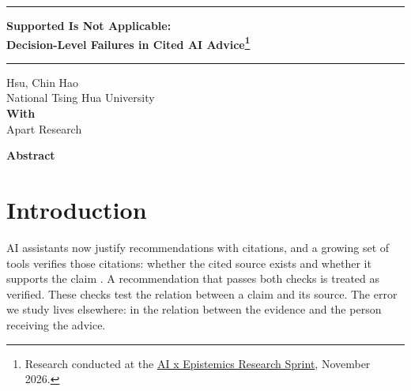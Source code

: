 \documentclass[11pt,letterpaper]{article}
\begin{document}
\vspace*{-0.35in}\noindent\rule{\textwidth}{2.4pt}\par\vspace{4pt}
\begin{center}
{\fontsize{19}{23}\selectfont\bfseries Supported Is Not Applicable:\\[2pt] Decision-Level Failures in Cited AI Advice\footnote{Research conducted at the \href{https://apartresearch.com/sprints/ai-x-epistemics-research-sprint-2026-11-13-to-2026-11-15}{AI x Epistemics Research Sprint}, November 2026.}}\par
\end{center}
\vspace{-2pt}\noindent\rule{\textwidth}{0.6pt}\par\vspace{2pt}
\begin{center}
Hsu, Chin Hao\\ National Tsing Hua University\\[4pt]
\textbf{With}\\ Apart Research
\end{center}
\vspace{-2pt}
\begin{center}{\large\bfseries Abstract}\end{center}
\vspace{-6pt}
\begin{list}{}{\leftmargin=0.3in\rightmargin=0.3in}\item\relax\small
\AbstractText
\end{list}
\vspace{0pt}
\begin{center}
\resizebox{\textwidth}{!}{}
\label{fig:concept}
\end{center}

\section{Introduction}
AI assistants now justify recommendations with citations, and a growing set of tools verifies those citations: whether the cited source exists \citep{ghostcite,citeaudit} and whether it supports the claim \citep{alce,factscore,lynx_paper}. A recommendation that passes both checks is treated as verified. These checks test the relation between a claim and its source. The error we study lives elsewhere: in the relation between the evidence and the person receiving the advice.
\end{document}
